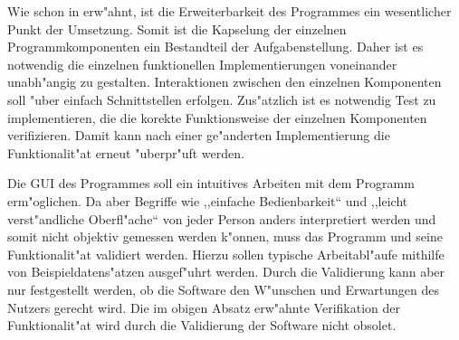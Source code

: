 Wie schon in  erw"ahnt, ist die Erweiterbarkeit des Programmes ein wesentlicher Punkt der Umsetzung.
Somit ist die Kapselung der einzelnen Programmkomponenten ein Bestandteil der Aufgabenstellung.
Daher ist es notwendig die einzelnen funktionellen Implementierungen voneinander unabh"angig zu gestalten.
Interaktionen zwischen den einzelnen Komponenten soll "uber einfach Schnittstellen erfolgen.
Zus"atzlich ist es notwendig Test zu implementieren, die die korekte Funktionsweise der einzelnen Komponenten verifizieren.
Damit kann nach einer ge"anderten Implementierung die Funktionalit"at erneut "uberpr"uft werden.

Die \ac{GUI} des Programmes soll ein intuitives Arbeiten mit dem Programm erm"oglichen.
Da aber Begriffe wie ,,einfache Bedienbarkeit`` und ,,leicht verst"andliche Oberfl"ache`` von jeder Person anders interpretiert werden und somit nicht objektiv gemessen werden k"onnen, muss das Programm und seine Funktionalit"at validiert werden.
Hierzu sollen typische Arbeitabl"aufe mithilfe von Beispieldatens"atzen ausgef"uhrt werden.
Durch die Validierung kann aber nur festgestellt werden, ob die Software den W"unschen und Erwartungen des Nutzers gerecht wird.
Die im obigen Absatz erw"ahnte Verifikation der Funktionalit"at wird durch die Validierung der Software nicht obsolet.

